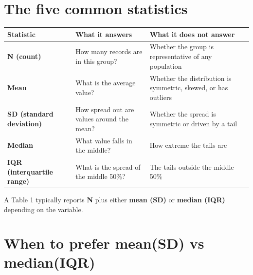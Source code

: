 \documentclass[
  letterpaper,
  DIV=11,
  numbers=noendperiod,
  oneside]{scrreprt}
\begin{document}
\section*{The five common statistics}\label{the-five-common-statistics}


\begin{longtable}[]{@{}
  >{\raggedright\arraybackslash}p{}
  >{\raggedright\arraybackslash}p{}
  >{\raggedright\arraybackslash}p{}@{}}
\toprule\noalign{}
\begin{minipage}[b]{\linewidth}\raggedright
Statistic
\end{minipage} & \begin{minipage}[b]{\linewidth}\raggedright
What it answers
\end{minipage} & \begin{minipage}[b]{\linewidth}\raggedright
What it does not answer
\end{minipage} \\
\midrule\noalign{}
\endhead
\bottomrule\noalign{}
\endlastfoot
\textbf{N (count)} & How many records are in this group? & Whether the
group is representative of any population \\
\textbf{Mean} & What is the average value? & Whether the distribution is
symmetric, skewed, or has outliers \\
\textbf{SD (standard deviation)} & How spread out are values around the
mean? & Whether the spread is symmetric or driven by a tail \\
\textbf{Median} & What value falls in the middle? & How extreme the
tails are \\
\textbf{IQR (interquartile range)} & What is the spread of the middle
50\%? & The tails outside the middle 50\% \\
\end{longtable}

A Table 1 typically reports \textbf{N} plus either \textbf{mean (SD)} or
\textbf{median (IQR)} depending on the variable.

\section*{When to prefer mean(SD) vs
median(IQR)}\label{when-to-prefer-meansd-vs-medianiqr}
\end{document}
